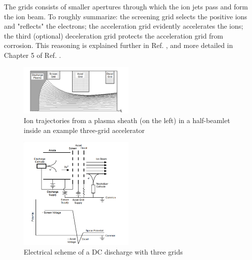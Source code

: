 \documentclass[twocolumn,12pt]{article}
\numberwithin{equation}{section} %
\numberwithin{equation}{section}
\begin{document}
The grids consists of smaller apertures through which the ion jets pass and form the ion beam. To roughly summarize: the screening grid selects the positive ions and "reflects" the electrons; the acceleration grid evidently accelerates the ions; the third (optional) deceleration grid protects the acceleration grid from corrosion. This reasoning is explained further in Ref. \cite{mitcourse}, and more detailed in Chapter 5 of Ref. \cite{fundamentalsofelectricpropulsion}.
\vfill
\begin{figure}[H]
    \centering
    \includegraphics[width=0.5\textwidth]{figs/motioninsidegrids.PNG}
    \caption{Ion trajectories from a plasma sheath (on the left) in a half-beamlet inside an example three-grid accelerator\cite{fundamentalsofelectricpropulsion}}
    \label{motioninsidegrids}
\end{figure}


\begin{figure}[H]
    \centering
    \includegraphics[width=0.5\textwidth]{figs/Grids.PNG}
    \caption{Electrical scheme of a DC discharge with three grids \cite{fundamentalsofelectricpropulsion}}
    \label{electricalschemewithgrids}
\end{figure}
\end{document}
